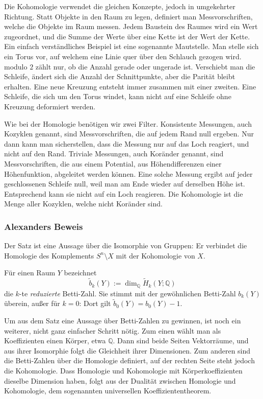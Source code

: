 Die Kohomologie verwendet die gleichen Konzepte, jedoch in umgekehrter Richtung.
%
Statt Objekte in den Raum zu legen, definiert man Messvorschriften, welche die Objekte im Raum messen.
Jedem Baustein des Raumes wird ein Wert zugeordnet, und die Summe der Werte über eine Kette ist der Wert der Kette.
Ein einfach verständliches Beispiel ist eine sogenannte Mautstelle.
Man stelle sich ein Torus vor, auf welchem eine Linie quer über den Schlauch gezogen wird.
modulo $2$ zählt nur, ob die Anzahl gerade oder ungerade ist.
Verschiebt man die Schleife, ändert sich die Anzahl der Schnittpunkte, aber die Parität bleibt erhalten.
Eine neue Kreuzung entsteht immer zusammen mit einer zweiten.
Eine Schleife, die sich um den Torus windet, kann nicht auf eine Schleife ohne Kreuzung deformiert werden.

Wie bei der Homologie benötigen wir zwei Filter.
Konsistente Messungen, auch Kozyklen genannt, sind Messvorschriften, die auf jedem Rand null ergeben.
Nur dann kann man sicherstellen, dass die Messung nur auf das Loch reagiert, und nicht auf den Rand.
Triviale Messungen, auch Koränder genannt, sind Messvorschriften, die aus einem Potential, aus Höhendifferenzen einer Höhenfunktion, abgeleitet werden können.
Eine solche Messung ergibt auf jeder geschlossenen Schleife null, weil man am Ende wieder auf derselben Höhe ist.
Entsprechend kann sie nicht auf ein Loch reagieren.
Die Kohomologie ist die Menge aller Kozyklen, welche nicht Koränder sind.

\subsubsection{Alexanders Beweis}



Der Satz ist eine Aussage über die Isomorphie von Gruppen:
Er verbindet die Homologie des Komplements $S^n \setminus X$ mit der Kohomologie von $X$.

Für einen Raum $Y$ bezeichnet
\[
    \tilde{b}_k(Y) := \dim_{\mathbb{Q}} \tilde{H}_k(Y; \mathbb{Q})
\]
die $k$-te \emph{reduzierte} Betti-Zahl.
Sie stimmt mit der gewöhnlichen Betti-Zahl $b_k(Y)$ überein, außer für $k = 0$: Dort gilt $\tilde{b}_0(Y) = b_0(Y) - 1$.

Um aus dem Satz eine Aussage über Betti-Zahlen zu gewinnen, ist noch ein
weiterer, nicht ganz einfacher Schritt nötig.
Zum einen wählt man als Koeffizienten einen Körper, etwa $\mathbb{Q}$.
Dann sind beide Seiten Vektorräume, und aus ihrer Isomorphie folgt die Gleichheit ihrer Dimensionen.
Zum anderen sind die Betti-Zahlen über die Homologie definiert, auf der rechten Seite steht jedoch die Kohomologie.
Dass Homologie und Kohomologie mit Körperkoeffizienten dieselbe Dimension haben, folgt aus der Dualität zwischen Homologie und Kohomologie, dem sogenannten universellen Koeffiziententheorem.

